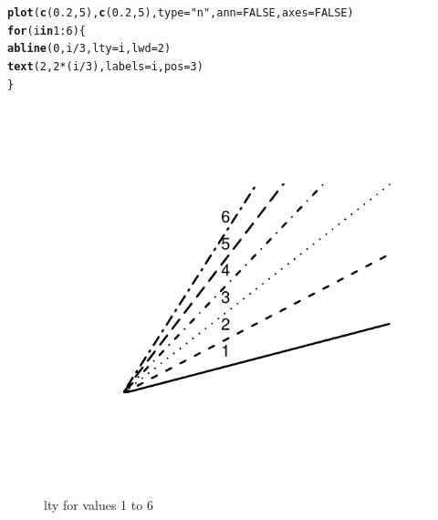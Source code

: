 \documentclass{config/apuntes}\usepackage[]{graphicx}\usepackage[]{xcolor}
\makeatletter
\def\maxwidth{ %
  \ifdim\Gin@nat@width>\linewidth
    \linewidth
  \else
    \Gin@nat@width
  \fi
}
\newcommand{\hlnum}[1]{\textcolor[rgb]{0.686,0.059,0.569}{#1}}%
\newcommand{\hlsng}[1]{\textcolor[rgb]{0.192,0.494,0.8}{#1}}%
\newcommand{\hlopt}[1]{\textcolor[rgb]{0,0,0}{#1}}%
\newcommand{\hldef}[1]{\textcolor[rgb]{0.345,0.345,0.345}{#1}}%
\newcommand{\hlkwa}[1]{\textcolor[rgb]{0.161,0.373,0.58}{\textbf{#1}}}%
\newcommand{\hlkwc}[1]{\textcolor[rgb]{0.333,0.667,0.333}{#1}}%
\newcommand{\hlkwd}[1]{\textcolor[rgb]{0.737,0.353,0.396}{\textbf{#1}}}%
\newenvironment{kframe}{%
 \def\at@end@of@kframe{}%
 \ifinner\ifhmode%
  \def\at@end@of@kframe{\end{minipage}}%
  \begin{minipage}{\columnwidth}%
 \fi\fi%
 \def\FrameCommand##1{\hskip\@totalleftmargin \hskip-\fboxsep
 \colorbox{shadecolor}{##1}\hskip-\fboxsep
     \hskip-\linewidth \hskip-\@totalleftmargin \hskip\columnwidth}%
 \MakeFramed {\advance\hsize-\width
   \@totalleftmargin\z@ \linewidth\hsize
   \@setminipage}}%
 {\par\unskip\endMakeFramed%
 \at@end@of@kframe}
\newenvironment{knitrout}{}{} %
\makeatother
\begin{document}
\begin{knitrout}
\color{fgcolor}\begin{kframe}
\begin{alltt}
\hlkwd{plot}\hldef{(}\hlkwd{c}\hldef{(}\hlnum{0.2}\hldef{,} \hlnum{5}\hldef{),} \hlkwd{c}\hldef{(}\hlnum{0.2}\hldef{,} \hlnum{5}\hldef{),} \hlkwc{type} \hldef{=} \hlsng{"n"}\hldef{,} \hlkwc{ann} \hldef{=} \hlnum{FALSE}\hldef{,} \hlkwc{axes} \hldef{=} \hlnum{FALSE}\hldef{)}
\hlkwa{for}\hldef{(i} \hlkwa{in} \hlnum{1}\hlopt{:}\hlnum{6}\hldef{) \{}
    \hlkwd{abline}\hldef{(}\hlnum{0}\hldef{, i}\hlopt{/}\hlnum{3}\hldef{,} \hlkwc{lty} \hldef{= i,} \hlkwc{lwd} \hldef{=} \hlnum{2}\hldef{)}
    \hlkwd{text}\hldef{(}\hlnum{2}\hldef{,} \hlnum{2} \hlopt{*} \hldef{(i}\hlopt{/}\hlnum{3}\hldef{),} \hlkwc{labels} \hldef{= i,} \hlkwc{pos} \hldef{=} \hlnum{3}\hldef{)}
\hldef{\}}
\end{alltt}
\end{kframe}\begin{figure}
\includegraphics[width=\maxwidth]{figure/ltytype-1} \caption[lty for values 1 to 6]{lty for values 1 to 6}\label{fig:ltytype}
\end{figure}

\end{knitrout}
\end{document}
